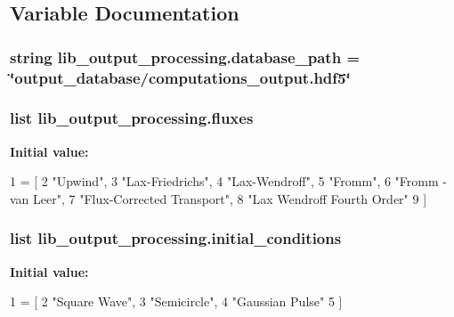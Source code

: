 \subsection{Variable Documentation}
\hypertarget{namespacelib__output__processing_ad1f7a4c194d8a2ab802e2d5aec50df5c}{
\subsubsection[{database\-\_\-path}]{\setlength{\rightskip}{0pt plus 5cm}string lib\-\_\-output\-\_\-processing.\-database\-\_\-path = \char`\"{}output\-\_\-database/computations\-\_\-output.\-hdf5\char`\"{}}}\label{namespacelib__output__processing_ad1f7a4c194d8a2ab802e2d5aec50df5c}
\hypertarget{namespacelib__output__processing_aa8835dfb3aa4d41cd54f9eba11f9fcee}{
\subsubsection[{fluxes}]{\setlength{\rightskip}{0pt plus 5cm}list lib\-\_\-output\-\_\-processing.\-fluxes}}\label{namespacelib__output__processing_aa8835dfb3aa4d41cd54f9eba11f9fcee}
{\bfseries Initial value\-:}
\begin{DoxyCode}
1 = [
2  \textcolor{stringliteral}{"Upwind"}, 
3  \textcolor{stringliteral}{"Lax-Friedrichs"}, 
4  \textcolor{stringliteral}{"Lax-Wendroff"}, 
5  \textcolor{stringliteral}{"Fromm"}, 
6  \textcolor{stringliteral}{"Fromm - van Leer"}, 
7  \textcolor{stringliteral}{"Flux-Corrected Transport"}, 
8  \textcolor{stringliteral}{"Lax Wendroff Fourth Order"}    
9   ]
\end{DoxyCode}
\hypertarget{namespacelib__output__processing_a88659a6c20fb70cd273430b1029d7e2d}{
\subsubsection[{initial\-\_\-conditions}]{\setlength{\rightskip}{0pt plus 5cm}list lib\-\_\-output\-\_\-processing.\-initial\-\_\-conditions}}\label{namespacelib__output__processing_a88659a6c20fb70cd273430b1029d7e2d}
{\bfseries Initial value\-:}
\begin{DoxyCode}
1 = [
2  \textcolor{stringliteral}{"Square Wave"}, 
3  \textcolor{stringliteral}{"Semicircle"}, 
4  \textcolor{stringliteral}{"Gaussian Pulse"}
5   ]
\end{DoxyCode}
